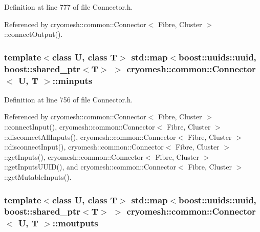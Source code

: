\-Definition at line 777 of file \-Connector.\-h.



\-Referenced by cryomesh\-::common\-::\-Connector$<$ Fibre, Cluster $>$\-::connect\-Output().

\hypertarget{classcryomesh_1_1common_1_1Connector_a4b53045b5f70f35b9cf8838474bdbc97}{
\subsubsection[{minputs}]{\setlength{\rightskip}{0pt plus 5cm}template$<$class \-U, class \-T$>$ std\-::map$<$boost\-::uuids\-::uuid, boost\-::shared\-\_\-ptr$<$\-T$>$ $>$ {\bf cryomesh\-::common\-::\-Connector}$<$ \-U, \-T $>$\-::{\bf minputs}}}\label{classcryomesh_1_1common_1_1Connector_a4b53045b5f70f35b9cf8838474bdbc97}


\-Definition at line 756 of file \-Connector.\-h.



\-Referenced by cryomesh\-::common\-::\-Connector$<$ Fibre, Cluster $>$\-::connect\-Input(), cryomesh\-::common\-::\-Connector$<$ Fibre, Cluster $>$\-::disconnect\-All\-Inputs(), cryomesh\-::common\-::\-Connector$<$ Fibre, Cluster $>$\-::disconnect\-Input(), cryomesh\-::common\-::\-Connector$<$ Fibre, Cluster $>$\-::get\-Inputs(), cryomesh\-::common\-::\-Connector$<$ Fibre, Cluster $>$\-::get\-Inputs\-U\-U\-I\-D(), and cryomesh\-::common\-::\-Connector$<$ Fibre, Cluster $>$\-::get\-Mutable\-Inputs().

\hypertarget{classcryomesh_1_1common_1_1Connector_a3a7175d8c33a8f5cd72592748c6dc15f}{
\subsubsection[{moutputs}]{\setlength{\rightskip}{0pt plus 5cm}template$<$class \-U, class \-T$>$ std\-::map$<$boost\-::uuids\-::uuid, boost\-::shared\-\_\-ptr$<$\-T$>$ $>$ {\bf cryomesh\-::common\-::\-Connector}$<$ \-U, \-T $>$\-::{\bf moutputs}}}\label{classcryomesh_1_1common_1_1Connector_a3a7175d8c33a8f5cd72592748c6dc15f}


